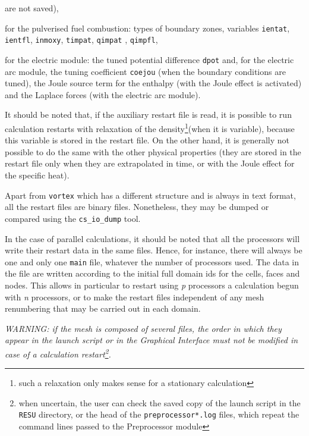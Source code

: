 {{{\begin{list}{-}{}
are not saved),
\item for the pulverised fuel combustion: types of boundary
zones, variables \texttt{ientat}, \texttt{ientfl}, \texttt{inmoxy}, \texttt{timpat}, \texttt{qimpat}
, \texttt{qimpfl},
\item for the electric module: the tuned potential difference \texttt{dpot}%
and, for the electric arc module, the tuning coefficient \texttt{coejou}%
(when the boundary conditions are tuned), the Joule source term for the enthalpy
(with the Joule effect is activated) and the Laplace forces (with the electric
arc module).
\end{list}

It should be noted that, if the auxiliary restart file is read, it is
possible to run calculation restarts with relaxation of the
density\footnote{such a relaxation only makes sense for a stationary
calculation}(when it is variable), because this variable is stored in the
restart file. On the other hand, it is generally not possible to do the
same with the other physical properties (they are stored in the restart
file only when they are extrapolated in time, or with the Joule effect for the
specific heat).

Apart from \texttt{vortex} which has a different structure and is
always in text format, all the restart files are binary
files. Nonetheless, they may be dumped or compared using
the \texttt{cs\_io\_dump} tool.

In the case of parallel calculations, it should be noted that all the processors
will write their restart data in the same files. Hence, for instance, there will
always be one and only one \texttt{main} file, whatever the number of
processors used. The data in the file are written according to the initial full
domain ids for the cells, faces and nodes. This allows in particular
to restart using {\it p} processors a calculation begun with {\it n} processors,
or to make the restart files independent of any mesh renumbering that may
be carried out in each domain.

{\em WARNING: if the mesh is composed of several files, the order
in which they appear in the launch script or in the Graphical Interface must not
be modified in case of a calculation restart\footnote{when uncertain, the user
can check the saved copy of the launch script in the \texttt{RESU} directory, or
the head of the \texttt{preprocessor*.log} files, which repeat the
command lines passed to the Preprocessor module}.}

}}}
